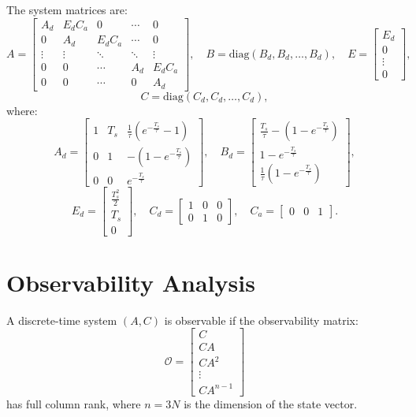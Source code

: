 \documentclass{article}
\begin{document}
The system matrices are:
\[
A = \begin{bmatrix}
A_d & E_d C_a & 0 & \cdots & 0 \\
0 & A_d & E_d C_a & \cdots & 0 \\
\vdots & \vdots & \ddots & \ddots & \vdots \\
0 & 0 & \cdots & A_d & E_d C_a \\
0 & 0 & \cdots & 0 & A_d
\end{bmatrix}, \quad
B = \text{diag}(B_d, B_d, \dots, B_d), \quad
E = \begin{bmatrix} E_d \\ 0 \\ \vdots \\ 0 \end{bmatrix},
\]
\[
C = \text{diag}(C_d, C_d, \dots, C_d),
\]
where:
\[
A_d = \begin{bmatrix} 
1 & T_s & \frac{1}{\tau} (e^{-\frac{T_s}{\tau}} - 1) \\ 
0 & 1 & -(1 - e^{-\frac{T_s}{\tau}}) \\ 
0 & 0 & e^{-\frac{T_s}{\tau}} 
\end{bmatrix}, \quad
B_d = \begin{bmatrix} 
\frac{T_s}{\tau} - (1 - e^{-\frac{T_s}{\tau}}) \\ 
1 - e^{-\frac{T_s}{\tau}} \\ 
\frac{1}{\tau} (1 - e^{-\frac{T_s}{\tau}}) 
\end{bmatrix},
\]
\[
E_d = \begin{bmatrix} \frac{T_s^2}{2} \\ T_s \\ 0 \end{bmatrix}, \quad
C_d = \begin{bmatrix} 1 & 0 & 0 \\ 0 & 1 & 0 \end{bmatrix}, \quad
C_a = \begin{bmatrix} 0 & 0 & 1 \end{bmatrix}.
\]

\section{Observability Analysis}
A discrete-time system $(A, C)$ is observable if the observability matrix:
\[
\mathcal{O} = \begin{bmatrix} C \\ CA \\ CA^2 \\ \vdots \\ CA^{n-1} \end{bmatrix}
\]
has full column rank, where $n = 3N$ is the dimension of the state vector.
\end{document}
